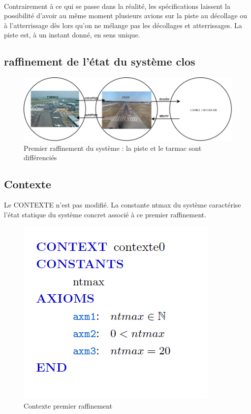 \paragraph{}
Contrairement à ce qui se passe dans la réalité, les spécifications laissent la possibilité d'avoir au même moment plusieurs avions sur la piste au décollage ou à l'atterrissage dès lors qu'on ne mélange pas les décollages et atterrissages.
La piste est, à un instant donné, en sens unique.


\subsection{raffinement de l'état du système clos}
\begin{figure}[H]
	\begin{center}	
		\includegraphics[scale=0.4]{images/1/raf1}
		\caption{Premier raffinement du système : la piste et le tarmac sont différenciés}
		\label{raf1}
	\end{center}
\end{figure}

\subsection{Contexte}
Le CONTEXTE n'est pas modifié. La constante ntmax du système caractérise l'état statique du système concret associé à ce premier raffinement.

\begin{figure}[H]
	\begin{center}	
		\includegraphics[scale=0.4]{images/1/ctx1}
		\caption{Contexte premier raffinement}
		\label{ctx1}
	\end{center}
\end{figure}

